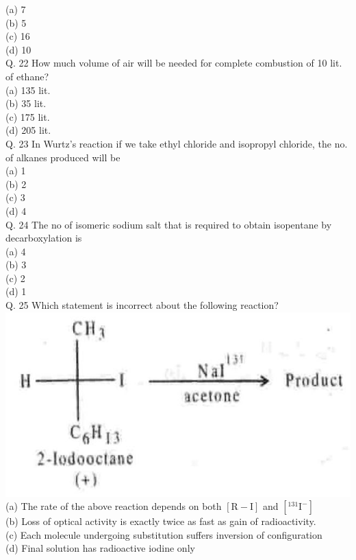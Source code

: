 \documentclass[10pt]{article}
\begin{document}
(a) 7\\
(b) 5\\
(c) 16\\
(d) 10\\
Q. 22 How much volume of air will be needed for complete combustion of 10 lit. of ethane?\\
(a) 135 lit.\\
(b) 35 lit.\\
(c) 175 lit.\\
(d) 205 lit.\\
Q. 23 In Wurtz's reaction if we take ethyl chloride and isopropyl chloride, the no. of alkanes produced will be\\
(a) 1\\
(b) 2\\
(c) 3\\
(d) 4\\
Q. 24 The no of isomeric sodium salt that is required to obtain isopentane by decarboxylation is\\
(a) 4\\
(b) 3\\
(c) 2\\
(d) 1\\
Q. 25 Which statement is incorrect about the following reaction?\\
\includegraphics[max width=\textwidth, center]{2025_01_28_8470952b98110cec3aabg-231(4)}\\
(a) The rate of the above reaction depends on both $[\mathrm{R}-\mathrm{I}]$ and $\left[{ }^{131} \mathrm{I}^{-}\right]$\\
(b) Loss of optical activity is exactly twice as fast as gain of radioactivity.\\
(c) Each molecule undergoing substitution suffers inversion of configuration\\
(d) Final solution has radioactive iodine only\\
\end{document}
